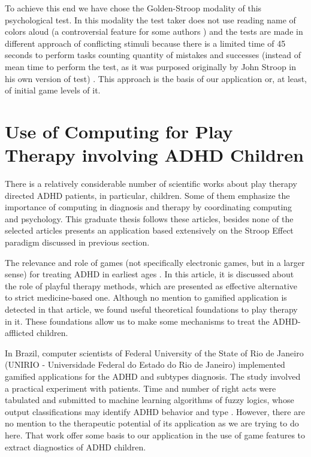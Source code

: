 To achieve this end we have chose the Golden-Stroop modality of this psychological test. In this modality the test taker does not use reading name of colors aloud (a controversial feature for some authors \citep{macleod}) and the tests are made in different approach of conflicting stimuli because there is a limited time of 45 seconds to perform tasks counting quantity of mistakes and successes (instead of mean time to perform the test, as it was purposed originally by John Stroop in his own version of test) \citep{goldencj}. This approach is the basis of our application or, at least, of initial game levels of it.



\section{Use of Computing for Play Therapy involving ADHD Children}



There is a relatively considerable number of scientific works about play therapy directed ADHD patients, in particular, children. Some of them emphasize the importance of computing in diagnosis and therapy by coordinating computing and psychology. This graduate thesis follows these articles, besides none of the selected articles presents an application based extensively on the Stroop Effect paradigm discussed in previous section. 



The relevance and role of games (not specifically electronic games, but in a larger sense) for treating ADHD in earliest ages \citep{Psychoanalytic}. In this article, it is discussed about the role of playful therapy methods, which are presented as effective alternative to strict medicine-based one. Although no mention to gamified application is detected in that article, we found useful theoretical foundations to play therapy in it. These foundations allow us to make some mechanisms to treat the ADHD-afflicted children.



In Brazil, computer scientists of Federal University of the State of Rio de Janeiro (UNIRIO - Universidade Federal do Estado do Rio de Janeiro) implemented gamified applications for the ADHD and subtypes diagnosis. The study involved a practical experiment with patients. Time and number of right acts were tabulated and submitted to machine learning algorithms of fuzzy logics, whose output classifications may identify ADHD behavior  and type \citep{brasileiros}. However, there are no mention to the therapeutic potential of its application as we are trying to do here. That work offer some basis to our application in the use of game features to extract diagnostics of ADHD children.



